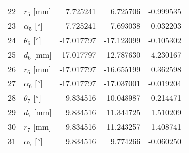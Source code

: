 \documentclass{standalone}%
\begin{document}
\begin{tabular}{llrrr}
22 &              $r_{5}$ [mm] &   7.725241 &   6.725706 &  -0.999535 \\
23 &  $\alpha_{5}$ [$\degree$] &   7.725241 &   7.693038 &  -0.032203 \\
24 &  $\theta_{6}$ [$\degree$] & -17.017797 & -17.123099 &  -0.105302 \\
25 &              $d_{6}$ [mm] & -17.017797 & -12.787630 &   4.230167 \\
26 &              $r_{6}$ [mm] & -17.017797 & -16.655199 &   0.362598 \\
27 &  $\alpha_{6}$ [$\degree$] & -17.017797 & -17.037001 &  -0.019204 \\
28 &  $\theta_{7}$ [$\degree$] &   9.834516 &  10.048987 &   0.214471 \\
29 &              $d_{7}$ [mm] &   9.834516 &  11.344725 &   1.510209 \\
30 &              $r_{7}$ [mm] &   9.834516 &  11.243257 &   1.408741 \\
31 &  $\alpha_{7}$ [$\degree$] &   9.834516 &   9.774266 &  -0.060250 \\
\bottomrule
\end{tabular}
%
\end{document}
